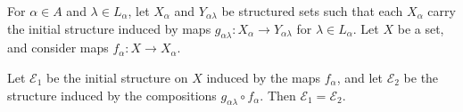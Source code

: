 \documentclass[article, a4paper, 11pt, oneside]{memoir}
\numberwithin{equation}{chapter}
\newcommand{\calE}{\mathcal{E}}
\newcommand{\calF}{\mathcal{F}}
\DeclarePairedDelimiter{\gen}{\langle}{\rangle} %
\begin{document}
\begin{proposition}
    \label{thm:composition_initial_structures}
    For $\alpha \in A$ and $\lambda \in L_\alpha$, let $X_\alpha$ and $Y_{\alpha\lambda}$ be structured sets such that each $X_\alpha$ carry the initial structure induced by maps $g_{\alpha\lambda} \colon X_\alpha \to Y_{\alpha\lambda}$ for $\lambda \in L_\alpha$. Let $X$ be a set, and consider maps $f_\alpha \colon X \to X_\alpha$.

    Let $\calE_1$ be the initial structure on $X$ induced by the maps $f_\alpha$, and let $\calE_2$ be the structure induced by the compositions $g_{\alpha\lambda} \circ f_\alpha$. Then $\calE_1 = \calE_2$.
    
\end{proposition}

\end{document}
